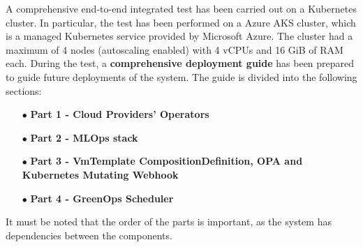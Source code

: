 A comprehensive end-to-end integrated test has been carried out on a Kubernetes cluster. 
In particular, the test has been performed on a Azure AKS cluster, which is a managed Kubernetes service provided by Microsoft Azure.
The cluster had a maximum of 4 nodes (autoscaling enabled) with 4 vCPUs and 16 GiB of RAM each.
During the test, a \textbf{comprehensive deployment guide} has been prepared to guide future deployments of the system.
The guide is divided into the following sections:
\begin{itemize}[itemsep=0.2pt, topsep=1pt]
    \item[$\bullet$] \textbf{Part 1 - Cloud Providers' Operators}
    \item[$\bullet$] \textbf{Part 2 - MLOps stack}
    \item[$\bullet$] \textbf{Part 3 - VmTemplate CompositionDefinition, OPA and Kubernetes Mutating Webhook}
    \item[$\bullet$] \textbf{Part 4 - GreenOps Scheduler}
\end{itemize}

It must be noted that the order of the parts is important, as the system has dependencies between the components. \newline

